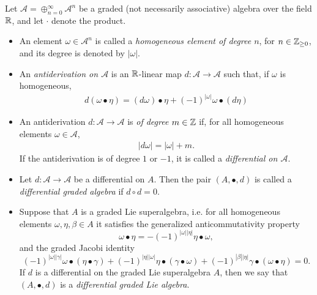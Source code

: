 \begin{definition} \label{defnDiffGAlgebraLieALgebraMorphism}
Let $\mathcal A = \oplus_{n = 0}^\infty \mathcal A^n$ be a graded (not necessarily associative) algebra over the field $\mathbb{R}$, and let $\cdot$ denote the product.
    \begin{itemize}
    
    \item An element $\omega \in \mathcal A^n$ is called a \emph{homogeneous element of degree $n$}, for $n \in \mathbb{Z}_{\geq 0}$, and its degree is denoted by $|\omega|$.
    
    \item An \emph{antiderivation on $\mathcal A$} is an $\mathbb{R}$-linear map $d: \mathcal A \to \mathcal A$ such that, if $\omega$ is homogeneous, 
    \begin{align}\label{equationDefinitionGradedLeibnizInDifferentialGradedAlgebra}
        d(\omega \bullet \eta) = (d\omega)\bullet\eta + (-1)^{|\omega|} \omega \bullet (d\eta)
    \end{align}
    
    \item An antiderivation $d: \mathcal A \to \mathcal A$ is \emph{of degree $m \in \mathbb{Z}$} if, for all homogeneous elements $\omega \in \mathcal A$,
    \begin{align}
        |d\omega| = |\omega| + m.
    \end{align}
    If the antiderivation is of degree $1$ or $-1$, it is called a \emph{differential on $\mathcal A$}.
    
    \item Let $d: \mathcal A \to \mathcal A$ be a differential on $A$. Then the pair $(A, \bullet, d)$ is called a \emph{differential graded algebra} if $d \circ d = 0$. 
    
    \item Suppose that $A$ is a graded Lie superalgebra, i.e. for all homogeneous elements $\omega, \eta, \beta \in A$ it satisfies the generalized anticommutativity property
    \begin{equation}\label{equationGradedCommutativeMinusGeneral}
        \omega \bullet \eta = -(-1)^{|\omega||\eta|} \eta \bullet \omega,
    \end{equation}
    and the graded Jacobi identity
    \begin{equation}\label{gradedJacobiIdentityGeneralizedAssociativity}
        (-1)^{|\omega||\gamma|} \omega \bullet (\eta \bullet \gamma) +
        (-1)^{|\eta||\omega|} \eta \bullet (\gamma \bullet \omega) +
        (-1)^{|\beta||\eta|} \gamma \bullet (\omega \bullet \eta) = 0.
    \end{equation}
    If $d$ is a differential on the graded Lie superalgebra $A$, then we say that $(A, \bullet, d)$ is a \emph{differential graded Lie algebra}.
    

\end{itemize}
\end{definition}
